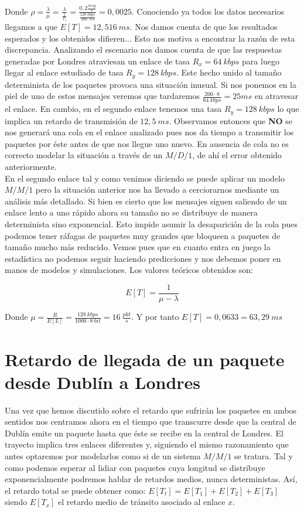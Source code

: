 \documentclass{report}[10 pt]
\begin{document}
		Donde $\rho = \frac{\lambda}{\mu} = \frac{\lambda}{\frac{1}{T_s}} = \frac{0,2 \frac{msg}{s}}{\frac{128\ kbps}{200 \cdot 8\ b}} = 0,0025$. Conociendo ya todos los datos necesarios llegamos a que $E[T] = 12,516\ ms$. Nos damos cuenta de que los resultados esperados y los obtenidos difieren... Esto nos motiva a encontrar la razón de esta discrepancia. Analizando el escenario nos damos cuenta de que las respuestas generadas por Londres atraviesan un enlace de tasa $R_x = 64\ kbps$ para luego llegar al enlace estudiado de tasa $R_y = 128\ kbps$. Este hecho unido al tamaño determinista de los paquetes provoca una situación inusual. Si nos ponemos en la piel de uno de estos mensajes veremos que tardaremos $\frac{200 \cdot 8}{64\ kbps} = 25 ms$ en atravesar el enlace. En cambio, en el segundo enlace tenemos una tasa $R_y = 128\ kbps$ lo que implica un retardo de transmisión de $12,5\ ms$. Observamos entonces que \textbf{NO} se nos generará una cola en el enlace analizado pues nos da tiempo a transmitir los paquetes por éste antes de que nos llegue uno nuevo. En ausencia de cola no es correcto modelar la situación a través de un $M/D/1$, de ahí el error obtenido anteriormente.
		\\

		En el segundo enlace tal y como venimos diciendo se puede aplicar un modelo $M/M/1$ pero la situación anterior nos ha llevado a cerciorarnos mediante un análisis más detallado. Si bien es cierto que los mensajes siguen saliendo de un enlace lento a uno rápido ahora su tamaño no se distribuye de manera determinista sino exponencial. Esto impide asumir la desaparición de la cola pues podemos tener ráfagas de paquetes muy grandes que bloqueen a paquetes de tamaño mucho más reducido. Vemos pues que en cuanto entra en juego la estadística no podemos seguir haciendo predicciones y nos debemos poner en manos de modelos y simulaciones. Los valores teóricos obtenidos son:

		$$E[T] = \frac{1}{\mu - \lambda}$$

		Donde $\mu = \frac{R}{E[L]} = \frac{128\ kbps}{1000 \cdot 8\ bit} = 16\ \frac{pkt}{s}$. Y por tanto $E[T] = 0,0633 = 63,29\ ms$

	\section{Retardo de llegada de un paquete desde Dublín a Londres}
		Una vez que hemos discutido sobre el retardo que sufrirán los paquetes en ambos sentidos nos centramos ahora en el tiempo que transcurre desde que la central de Dublín emite un paquete hasta que éste se recibe en la central de Londres. El trayecto implica tres enlaces diferentes y, siguiendo el mismo razonamiento que antes optaremos por modelarlos como si de un sistema $M/M/1$ se tratara. Tal y como podemos esperar al lidiar con paquetes cuya longitud se distribuye exponencialmente podremos hablar de retardos medios, nunca deterministas. Así, el retardo total se puede obtener como: $E[T_t] = E[T_1] + E[T_2] + E[T_3]$ siendo $E[T_x]$ el retardo medio de tránsito asociado al enlace $x$.\\
\end{document}
